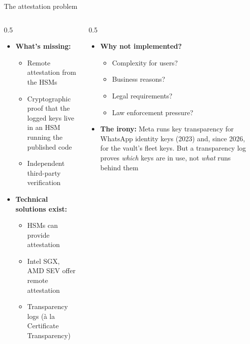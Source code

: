 \ifdefined\PRESENTATION\else\PassOptionsToClass{handout}{beamer}\fi\documentclass[aspectratio=169, lualatex]{beamer}
\begin{document}
\begin{frame}{The attestation problem}
	\begin{columns}[c]
		\begin{column}{0.5\textwidth}
			\begin{itemize}
				\item \textbf{What's missing:}
				      \begin{itemize}
					      \item Remote attestation from the HSMs
					      \item Cryptographic proof that the logged keys live in an HSM running the published code
					      \item Independent third-party verification
				      \end{itemize}
				\item \textbf{Technical solutions exist:}
				      \begin{itemize}
					      \item HSMs can provide attestation
					      \item Intel SGX, AMD SEV offer remote attestation
					      \item Transparency logs (\`a la Certificate Transparency)
				      \end{itemize}
			\end{itemize}
		\end{column}
		\begin{column}{0.5\textwidth}
			\begin{itemize}
				\item \textbf{Why not implemented?}
				      \begin{itemize}
					      \item Complexity for users?
					      \item Business reasons?
					      \item Legal requirements?
					      \item Law enforcement pressure?
				      \end{itemize}
				\item \textbf{The irony:} Meta runs key transparency for WhatsApp identity keys (2023) and, since 2026, for the vault's fleet keys. But a transparency log proves \textit{which} keys are in use, not \textit{what} runs behind them
			\end{itemize}
		\end{column}
	\end{columns}
\end{frame}
\end{document}
